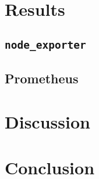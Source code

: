 \section{Results}
\subsection{\texttt{node\_exporter}}
\subsection{Prometheus}

\section{Discussion}

\section{Conclusion}
